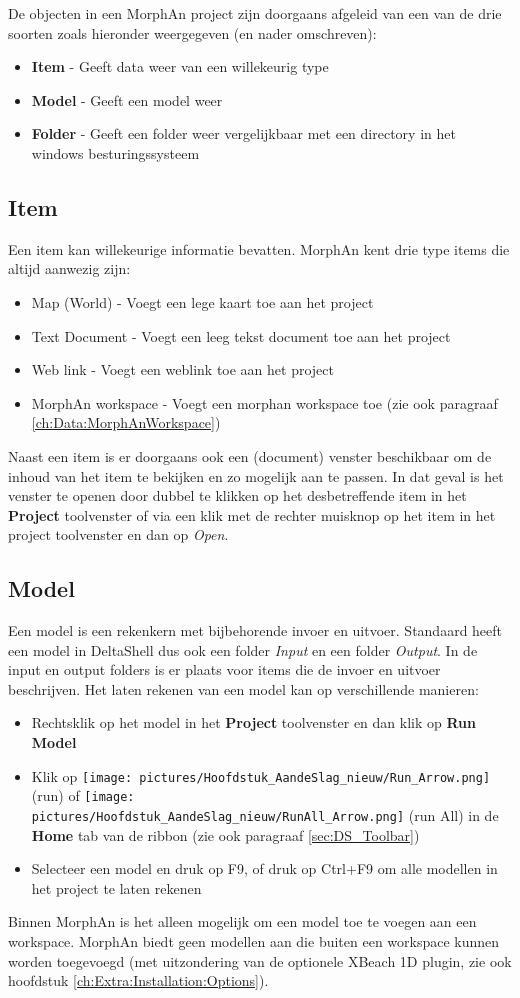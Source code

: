 De objecten in een MorphAn project zijn doorgaans afgeleid van een van de drie soorten zoals hieronder weergegeven (en nader omschreven):
\begin{itemize}
\item \textbf{Item} - Geeft data weer van een willekeurig type
\item \textbf{Model} - Geeft een model weer
\item \textbf{Folder} - Geeft een folder weer vergelijkbaar met een directory in het windows besturingssysteem
\end{itemize}

\subsection{Item}
Een item kan willekeurige informatie bevatten. MorphAn kent drie type items die altijd aanwezig zijn:
\begin{itemize}
\item Map (World) - Voegt een lege kaart toe aan het project
\item Text Document - Voegt een leeg tekst document toe aan het project
\item Web link - Voegt een weblink toe aan het project
\item MorphAn workspace - Voegt een morphan workspace toe (zie ook paragraaf \ref{ch:Data:MorphAnWorkspace})
\end{itemize}
Naast een item is er doorgaans ook een (document) venster beschikbaar om de inhoud van het item te bekijken en zo mogelijk aan te passen. In dat geval is het venster te openen door dubbel te klikken op het desbetreffende item in het \textbf{Project} toolvenster of via een klik met de rechter muisknop op het item in het project toolvenster en dan op \textit{Open}.

\subsection{Model}
Een model is een rekenkern met bijbehorende invoer en uitvoer. Standaard heeft een model in DeltaShell dus ook een folder \textit{Input} en een folder \textit{Output}. In de input en output folders is er plaats voor items die de invoer en uitvoer beschrijven. Het laten rekenen van een model kan op verschillende manieren:
\begin{itemize}
\item Rechtsklik op het model in het \textbf{Project} toolvenster en dan klik op \textbf{Run Model}
\item Klik op \texttt{[image: pictures/Hoofdstuk\_AandeSlag\_nieuw/Run\_Arrow.png]} (run) of \texttt{[image: pictures/Hoofdstuk\_AandeSlag\_nieuw/RunAll\_Arrow.png]} (run All) in de \textbf{Home} tab van de ribbon (zie ook paragraaf \ref{sec:DS_Toolbar})
\item Selecteer een model en druk op F9, of druk op Ctrl+F9 om alle modellen in het project te laten rekenen
\end{itemize}
Binnen MorphAn is het alleen mogelijk om een model toe te voegen aan een workspace. MorphAn biedt geen modellen aan die buiten een workspace kunnen worden toegevoegd (met uitzondering van de optionele XBeach 1D plugin, zie ook hoofdstuk \ref{ch:Extra:Installation:Options}).

